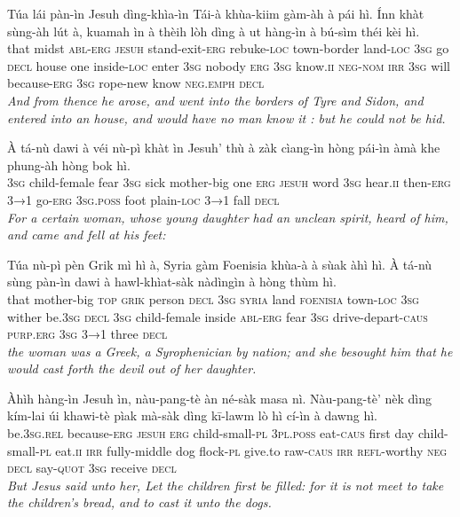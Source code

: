 \documentclass[11pt,a4paper]{article}
\begin{document}
\begin{exe}
\gll Túa lái pàn-ìn Jesuh dìng-khìa-ìn Tái-à khùa-kiim gàm-àh à pái hì. Ínn khàt sùng-àh lút à, kuamah ìn à thèih lòh dìng à ut hàng-ìn à bú-sìm théi kèi hì. \\
     that midst \textsc{abl}-\textsc{erg} \textsc{jesuh} stand-exit-\textsc{erg} rebuke-\textsc{loc} town-border land-\textsc{loc} \textsc{3sg} go \textsc{decl} house one inside-\textsc{loc} enter \textsc{3sg} nobody \textsc{erg} \textsc{3sg} know.\textsc{ii} \textsc{neg}-\textsc{nom} \textsc{irr} \textsc{3sg} will because-\textsc{erg} \textsc{3sg} rope-new know \textsc{neg}.\textsc{emph} \textsc{decl} \\
\glt \textcolor{kjvcolor}{\textit{And from thence he arose, and went into the borders of Tyre and Sidon, and entered into an house, and would have no man know it : but he could not be hid.}}

\gll À tá-nù dawi à véi nù-pì khàt ìn Jesuh' thù à zàk cìang-ìn hòng pái-ìn àmà khe phung-àh hòng bok hì. \\
     \textsc{3sg} child-female fear \textsc{3sg} sick mother-big one \textsc{erg} \textsc{jesuh} word \textsc{3sg} hear.\textsc{ii} then-\textsc{erg} \textsc{3→1} go-\textsc{erg} \textsc{3sg}.\textsc{poss} foot plain-\textsc{loc} \textsc{3→1} fall \textsc{decl} \\
\glt \textcolor{kjvcolor}{\textit{For a certain woman, whose young daughter had an unclean spirit, heard of him, and came and fell at his feet:}}

\gll Túa nù-pì pèn Grik mì hì à, Syria gàm Foenisia khùa-à à sùak àhì hì. À tá-nù sùng pàn-ìn dawi à hawl-khìat-sàk nàdìngìn à hòng thùm hì. \\
     that mother-big \textsc{top} \textsc{grik} person \textsc{decl} \textsc{3sg} \textsc{syria} land \textsc{foenisia} town-\textsc{loc} \textsc{3sg} wither be.\textsc{3sg} \textsc{decl} \textsc{3sg} child-female inside \textsc{abl}-\textsc{erg} fear \textsc{3sg} drive-depart-\textsc{caus} \textsc{purp}.\textsc{erg} \textsc{3sg} \textsc{3→1} three \textsc{decl} \\
\glt \textcolor{kjvcolor}{\textit{the woman was a Greek, a Syrophenician by nation; and she besought him that he would cast forth the devil out of her daughter.}}

\gll Àhìh hàng-ìn Jesuh ìn, nàu-pang-tè àn né-sàk masa nì. Nàu-pang-tè' nèk dìng kím-lai úi khawi-tè pìak mà-sàk dìng kī-lawm lò hì cí-ìn à dawng hì. \\
     be.\textsc{3sg}.\textsc{rel} because-\textsc{erg} \textsc{jesuh} \textsc{erg} child-small-\textsc{pl} \textsc{3pl}.\textsc{poss} eat-\textsc{caus} first day child-small-\textsc{pl} eat.\textsc{ii} \textsc{irr} fully-middle dog flock-\textsc{pl} give.to raw-\textsc{caus} \textsc{irr} \textsc{refl}-worthy \textsc{neg} \textsc{decl} say-\textsc{quot} \textsc{3sg} receive \textsc{decl} \\
\glt \textcolor{kjvcolor}{\textit{But Jesus said unto her, Let the children first be filled: for it is not meet to take the children's bread, and to cast it unto the dogs.}}


\end{exe}
\end{document}
